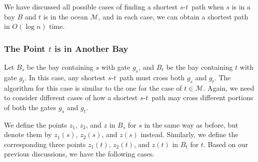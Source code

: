 \documentclass[english,runningheads,11pt]{llncs}
\def\calM{\mathcal{M}}
\def\st{$s$-$t$}
\begin{document}
We have discussed all possible cases of finding a shortest \st\ path
when $s$ is in a bay $B$ and $t$ is in the ocean $\calM$, and in each case,
we can obtain a shortest path in $O(\log n)$ time.

\subsubsection{The Point $t$ is in Another Bay}

Let $B_s$ be the bay containing $s$ with gate $g_s$, and
$B_t$ be the bay containing $t$ with gate $g_t$.
In this case, any shortest \st\ path must cross both $g_s$ and $g_t$. The
algorithm for this case is similar to the one for the case of $t\in \calM$. Again, we need to
consider different cases of how a shortest \st\ path may cross
different portions of both the gates $g_s$ and $g_t$.

We define the points $z_1$, $z_2$, and $z$ in $B_s$ for $s$ in the
same way as
before, but denote them by $z_1(s)$, $z_2(s)$, and $z(s)$ instead.
Similarly, we define the corresponding three points $z_1(t)$,
$z_2(t)$, and $z(t)$ in $B_t$ for $t$. Based on our previous
discussions, we have the following cases.
\end{document}
